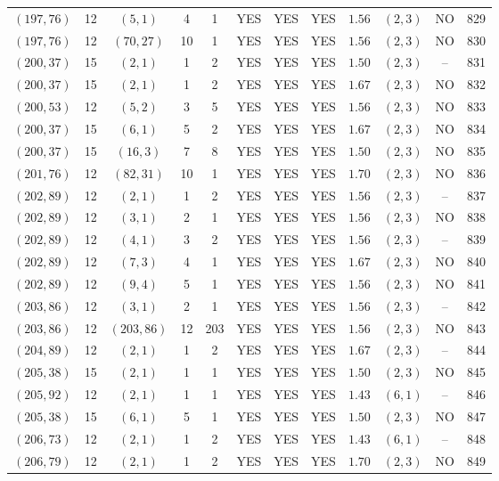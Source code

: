 \begin{longtable}{|c|c|c|c|c|c|c|c|c|c|c|c|}
$(197,76)$ & 12 & $(5,1)$ & 4 & 1 & YES & YES & YES & $1.56$ & $(2,3)$ & NO & 829\\
$(197,76)$ & 12 & $(70,27)$ & 10 & 1 & YES & YES & YES & $1.56$ & $(2,3)$ & NO & 830\\
$(200,37)$ & 15 & $(2,1)$ & 1 & 2 & YES & YES & YES & $1.50$ & $(2,3)$ & -- & 831\\
$(200,37)$ & 15 & $(2,1)$ & 1 & 2 & YES & YES & YES & $1.67$ & $(2,3)$ & NO & 832\\
$(200,53)$ & 12 & $(5,2)$ & 3 & 5 & YES & YES & YES & $1.56$ & $(2,3)$ & NO & 833\\
$(200,37)$ & 15 & $(6,1)$ & 5 & 2 & YES & YES & YES & $1.67$ & $(2,3)$ & NO & 834\\
$(200,37)$ & 15 & $(16,3)$ & 7 & 8 & YES & YES & YES & $1.50$ & $(2,3)$ & NO & 835\\
$(201,76)$ & 12 & $(82,31)$ & 10 & 1 & YES & YES & YES & $1.70$ & $(2,3)$ & NO & 836\\
$(202,89)$ & 12 & $(2,1)$ & 1 & 2 & YES & YES & YES & $1.56$ & $(2,3)$ & -- & 837\\
$(202,89)$ & 12 & $(3,1)$ & 2 & 1 & YES & YES & YES & $1.56$ & $(2,3)$ & NO & 838\\
$(202,89)$ & 12 & $(4,1)$ & 3 & 2 & YES & YES & YES & $1.56$ & $(2,3)$ & -- & 839\\
$(202,89)$ & 12 & $(7,3)$ & 4 & 1 & YES & YES & YES & $1.67$ & $(2,3)$ & NO & 840\\
$(202,89)$ & 12 & $(9,4)$ & 5 & 1 & YES & YES & YES & $1.56$ & $(2,3)$ & NO & 841\\
$(203,86)$ & 12 & $(3,1)$ & 2 & 1 & YES & YES & YES & $1.56$ & $(2,3)$ & -- & 842\\
$(203,86)$ & 12 & $(203,86)$ & 12 & 203 & YES & YES & YES & $1.56$ & $(2,3)$ & NO & 843\\
$(204,89)$ & 12 & $(2,1)$ & 1 & 2 & YES & YES & YES & $1.67$ & $(2,3)$ & -- & 844\\
$(205,38)$ & 15 & $(2,1)$ & 1 & 1 & YES & YES & YES & $1.50$ & $(2,3)$ & NO & 845\\
$(205,92)$ & 12 & $(2,1)$ & 1 & 1 & YES & YES & YES & $1.43$ & $(6,1)$ & -- & 846\\
$(205,38)$ & 15 & $(6,1)$ & 5 & 1 & YES & YES & YES & $1.50$ & $(2,3)$ & NO & 847\\
$(206,73)$ & 12 & $(2,1)$ & 1 & 2 & YES & YES & YES & $1.43$ & $(6,1)$ & -- & 848\\
$(206,79)$ & 12 & $(2,1)$ & 1 & 2 & YES & YES & YES & $1.70$ & $(2,3)$ & NO & 849\\

\end{longtable}

